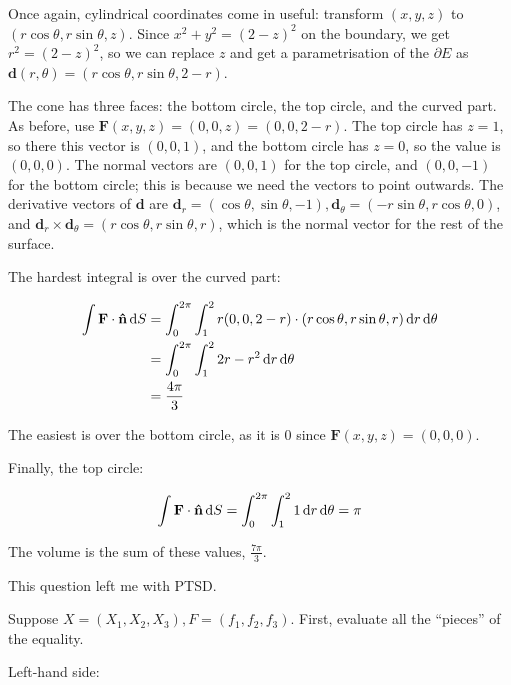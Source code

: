 
Once again, cylindrical coordinates come in useful: transform $(x, y, z)$ to $(r\cos\theta, r\sin\theta, z)$. Since $x^2 + y^2 = (2 - z)^2$ on the boundary, we get $r^2 = (2 - z)^2$, so we can replace $z$ and get a parametrisation of the $\partial E$ as $\mathbf{d}(r, \theta) = (r\cos\theta, r\sin\theta, 2 - r)$.

The cone has three faces: the bottom circle, the top circle, and the curved part. As before, use $\mathbf{F}(x, y, z) = (0, 0, z) = (0, 0, 2 - r)$. The top circle has $z = 1$, so there this vector is $(0, 0, 1)$, and the bottom circle has $z = 0$, so the value is $(0, 0, 0)$. The normal vectors are $(0, 0, 1)$ for the top circle, and $(0, 0, -1)$ for the bottom circle; this is because we need the vectors to point outwards. The derivative vectors of $\mathbf{d}$ are $\mathbf{d}_r = (\cos\theta, \sin\theta, -1), \mathbf{d}_{\theta} = (-r \sin\theta, r \cos\theta, 0)$, and $\mathbf{d}_r \times \mathbf{d}_{\theta} = (r\cos\theta, r\sin\theta, r)$, which is the normal vector for the rest of the surface.

The hardest integral is over the curved part:

\begin{align*}
  \int \mathbf{F} \cdot \mathbf{\hat{n}} \mathop{}\!\mathrm{d} S &= \int_0^{2\pi} \int_1^2 r(0, 0, 2 - r) \cdot (r\cos\theta, r\sin\theta, r) \mathop{}\!\mathrm{d} r \mathop{}\!\mathrm{d} \theta \\
  &= \int_0^{2\pi} \int_1^2 2r - r^2 \mathop{}\!\mathrm{d} r \mathop{}\!\mathrm{d} \theta \\
  &= \frac{4\pi}{3}
\end{align*}

The easiest is over the bottom circle, as it is 0 since $\mathbf{F}(x, y, z) = (0, 0, 0)$.

Finally, the top circle:

\begin{align*}
  \int \mathbf{F} \cdot \mathbf{\hat{n}} \mathop{}\!\mathrm{d} S = \int_0^{2\pi} \int_1^2 1 \mathop{}\!\mathrm{d} r \mathop{}\!\mathrm{d} \theta = \pi
\end{align*}

The volume is the sum of these values, $\frac{7\pi}{3}$.


This question left me with PTSD.

Suppose $X = (X_1, X_2, X_3), F = (f_1, f_2, f_3)$. First, evaluate all the ``pieces'' of the equality.

Left-hand side:

